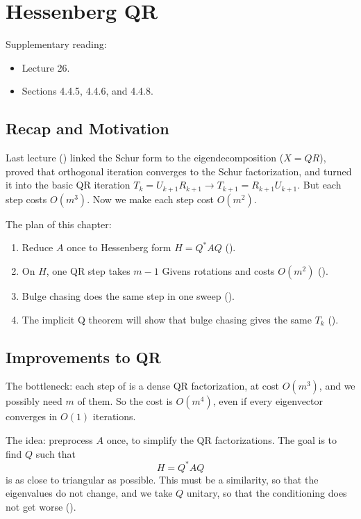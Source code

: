 \chapter{Hessenberg QR}
\label{ch:hessenberg-qr}

Supplementary reading:
\begin{itemize}
  \item \cite{TB} Lecture 26.
  \item \cite{Demmel} Sections 4.4.5, 4.4.6, and 4.4.8.
\end{itemize}

\section{Recap and Motivation}

Last lecture () linked the Schur form to the eigendecomposition ($X = QR$), proved that orthogonal iteration converges to the Schur factorization, and turned it into the basic QR iteration $T_k = U_{k+1}R_{k+1} \to T_{k+1} = R_{k+1}U_{k+1}$. But each step costs $O(m^3)$. Now we make each step cost $O(m^2)$.

The plan of this chapter:
\begin{enumerate}
  \item Reduce $A$ once to Hessenberg form $H = Q^\ast AQ$ ().
  \item On $H$, one QR step takes $m - 1$ Givens rotations and costs $O(m^2)$ ().
  \item Bulge chasing does the same step in one sweep ().
  \item The implicit Q theorem will show that bulge chasing gives the same $T_k$ ().
\end{enumerate}

\section{Improvements to QR}
\label{sec:qr-improvements}

The bottleneck: each step of  is a dense QR factorization, at cost $O(m^3)$, and we possibly need $m$ of them. So the cost is $O(m^4)$, even if every eigenvector converges in $O(1)$ iterations.

The idea: preprocess $A$ once, to simplify the QR factorizations. The goal is to find $Q$ such that
\begin{equation}
  H = Q^\ast AQ
\end{equation}
is as close to triangular as possible. This must be a similarity, so that the eigenvalues do not change, and we take $Q$ unitary, so that the conditioning does not get worse ().

